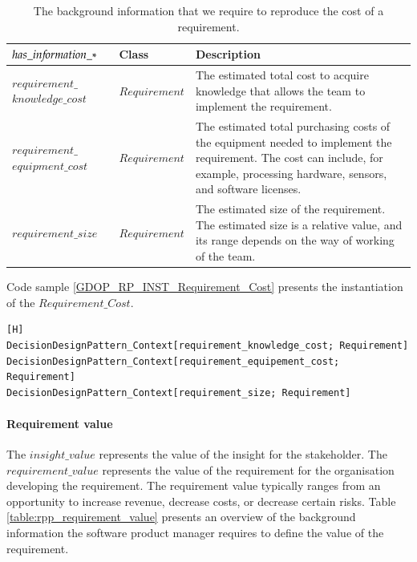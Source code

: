 \begin{table}[H]
\centering
\caption{The background information that we require to reproduce the cost of a requirement.}
\begin{tabular}{| p{3cm} | p{2.5cm} | p{9.5cm} | }
\hline
\rowcolor{document}
\color{documentText}$has\_in{\mkern-2mu f\mkern-3mu}ormation\_*$ & \color{documentText}Class & \color{documentText}Description  \\
\hline
$requirement\_$ $knowledge\_cost$ & $Requirement$ & The estimated total cost to acquire knowledge that allows the team to implement the requirement. \\ 
\hdashline
$requirement\_$ $equipment\_cost$ & $Requirement$ & The estimated total purchasing costs of the equipment needed to implement the requirement. The cost can include, for example, processing hardware, sensors, and software licenses. \\ 
\hdashline
$requirement\_size$ & $Requirement$ & The estimated size of the requirement. The estimated size is a relative value, and its range depends on the way of working of the team. \\ 
\hline
\end{tabular}
\label{table:rpp_requirement_cost}
\end{table}

Code sample \ref{GDOP_RP_INST_Requirement_Cost} presents the instantiation of the $Requirement\_Cost$. 

\begin{lstlisting}[float,language=GDOL,caption={The GDOL instantiation code of the information reproducing the $Requirement\_Cost$},label={GDOP_RP_INST_Requirement_Cost}][H]
DecisionDesignPattern_Context[requirement_knowledge_cost; Requirement] 
DecisionDesignPattern_Context[requirement_equipement_cost; Requirement]
DecisionDesignPattern_Context[requirement_size; Requirement]
\end{lstlisting}

\paragraph{Requirement value}
The $insight\_value$ represents the value of the insight for the stakeholder. The $requirement\_value$ represents the value of the requirement for the organisation developing the requirement. The requirement value typically ranges from an opportunity to increase revenue, decrease costs, or decrease certain risks. Table \ref{table:rpp_requirement_value} presents an overview of the background information the software product manager requires to define the value of the requirement.

